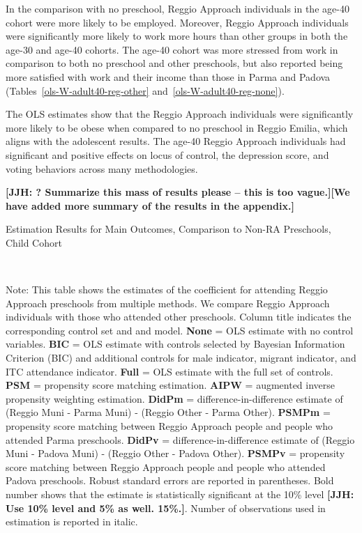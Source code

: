 In the comparison with no preschool, Reggio Approach individuals in the age-40 cohort were more likely to be employed. Moreover, Reggio Approach individuals were significantly more likely to work more hours than other groups in both the age-30 and age-40 cohorts. The age-40 cohort was more stressed from work in comparison to both no preschool and other preschools, but also reported being more satisfied with work and their income than those in Parma and Padova (Tables~\ref{ols-W-adult40-reg-other} and~\ref{ols-W-adult40-reg-none}). 

The OLS estimates show that the Reggio Approach individuals were significantly more likely to be obese when compared to no preschool in Reggio Emilia, which aligns with the adolescent results. The age-40 Reggio Approach individuals had significant and positive effects on locus of control, the depression score, and voting behaviors across many methodologies. 

\textbf{[JJH: ? Summarize this mass of results please -- this is too vague.][We have added more summary of the results in the appendix.]}



\begin{table}[H] \caption{Estimation Results for Main Outcomes, Comparison to Non-RA Preschools, Child Cohort} \label{ols-M-child-reg-pres}
\scalebox{0.7}{}
\vspace{1ex} \\
\footnotesize\raggedright{Note: This table shows the estimates of the coefficient for attending Reggio Approach preschools from multiple methods. We compare Reggio Approach individuals with those who attended other preschools. Column title indicates the corresponding control set and and model. \textbf{None} = OLS estimate with no control variables. \textbf{BIC} = OLS estimate with controls selected by Bayesian Information Criterion (BIC) and additional controls for male indicator, migrant indicator, and ITC attendance indicator. \textbf{Full} = OLS estimate with the full set of controls. \textbf{PSM} =  propensity score matching estimation. \textbf{AIPW} = augmented inverse propensity weighting estimation. \textbf{DidPm} = difference-in-difference estimate of (Reggio Muni - Parma Muni) - (Reggio Other - Parma Other). \textbf{PSMPm} = propensity score matching between Reggio Approach people and people who attended Parma preschools. \textbf{DidPv} = difference-in-difference estimate of (Reggio Muni - Padova Muni) - (Reggio Other - Padova Other). \textbf{PSMPv} = propensity score matching between Reggio Approach people and people who attended Padova preschools. Robust standard errors are reported in parentheses. Bold number shows that the estimate is statistically significant at the 10\% level \textbf{[JJH: Use 10\% level and 5\% as well. 15\%.]}. Number of observations used in estimation is reported in italic.}

\end{table}

